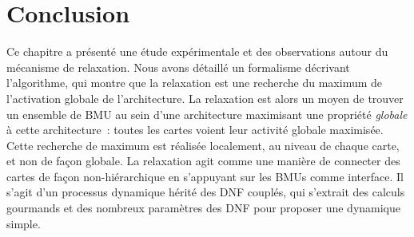 \documentclass[../main]{subfiles}
\begin{document}

%



\section{Conclusion}

Ce chapitre a présenté une étude expérimentale et des observations autour du mécanisme de relaxation. Nous avons détaillé un formalisme décrivant l'algorithme, qui montre que la relaxation est une recherche du maximum de l'activation globale de l'architecture.
La relaxation est alors un moyen de trouver un ensemble de BMU au sein d'une architecture maximisant une propriété \emph{globale} à cette architecture~: toutes les cartes voient leur activité globale maximisée. 
Cette recherche de maximum est réalisée localement, au niveau de chaque carte, et non de façon globale. La relaxation agit comme une manière de connecter des cartes de façon non-hiérarchique en s'appuyant sur les BMUs comme interface. Il s'agit d'un processus dynamique hérité des DNF couplés, qui s'extrait des calculs gourmands et des nombreux paramètres des DNF pour proposer une dynamique simple.
\end{document}

